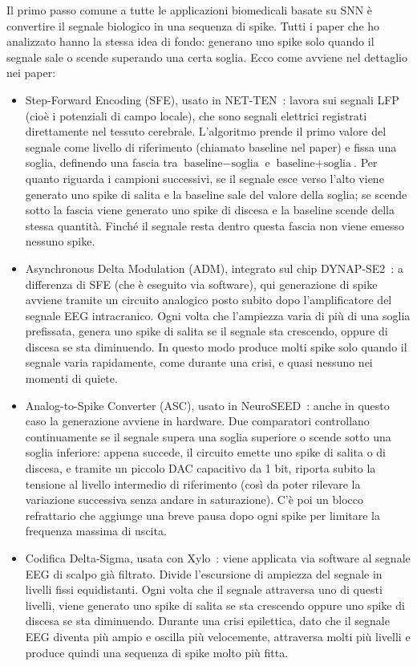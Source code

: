 Il primo passo comune a tutte le applicazioni biomedicali basate su SNN è convertire il segnale biologico in una sequenza di spike. Tutti i paper che ho analizzato hanno la stessa idea di fondo: generano uno spike solo quando il segnale sale o scende superando una certa soglia. Ecco come avviene nel dettaglio nei paper:
\begin{itemize}
  \item Step-Forward Encoding (SFE), usato in NET-TEN~\cite{ronchini2023}: lavora sui segnali LFP (cioè i potenziali di campo locale), che sono segnali elettrici registrati direttamente nel tessuto cerebrale. L'algoritmo prende il primo valore del segnale come livello di riferimento (chiamato baseline nel paper) e fissa una soglia, definendo una fascia tra $\text{baseline} - \text{soglia}$ e $\text{baseline} + \text{soglia}$. Per quanto riguarda i campioni successivi, se il segnale esce verso l'alto viene generato uno spike di salita e la baseline sale del valore della soglia; se scende sotto la fascia viene generato uno spike di discesa e la baseline scende della stessa quantità. Finché il segnale resta dentro questa fascia non viene emesso nessuno spike.
  \item Asynchronous Delta Modulation (ADM), integrato sul chip DYNAP-SE2~\cite{bartels2025}: a differenza di SFE (che è eseguito via software), qui generazione di spike avviene tramite un circuito analogico posto subito dopo l'amplificatore del segnale EEG intracranico. Ogni volta che l'ampiezza varia di più di una soglia prefissata, genera uno spike di salita se il segnale sta crescendo, oppure di discesa se sta diminuendo. In questo modo produce molti spike solo quando il segnale varia rapidamente, come durante una crisi, e quasi nessuno nei momenti di quiete.
  \item Analog-to-Spike Converter (ASC), usato in NeuroSEED~\cite{wu2026}: anche in questo caso la generazione avviene in hardware. Due comparatori controllano continuamente se il segnale supera una soglia superiore o scende sotto una soglia inferiore: appena succede, il circuito emette uno spike di salita o di discesa, e tramite un piccolo DAC capacitivo da 1 bit, riporta subito la tensione al livello intermedio di riferimento (così da poter rilevare la variazione successiva senza andare in saturazione). C'è poi un blocco refrattario che aggiunge una breve pausa dopo ogni spike per limitare la frequenza massima di uscita.
  \item Codifica Delta-Sigma, usata con Xylo~\cite{li2024}: viene applicata via software al segnale EEG di scalpo già filtrato. Divide l'escursione di ampiezza del segnale in livelli fissi equidistanti. Ogni volta che il segnale attraversa uno di questi livelli, viene generato uno spike di salita se sta crescendo oppure uno spike di discesa se sta diminuendo. Durante una crisi epilettica, dato che il segnale EEG diventa più ampio e oscilla più velocemente, attraversa molti più livelli e produce quindi una sequenza di spike molto più fitta.
\end{itemize}


